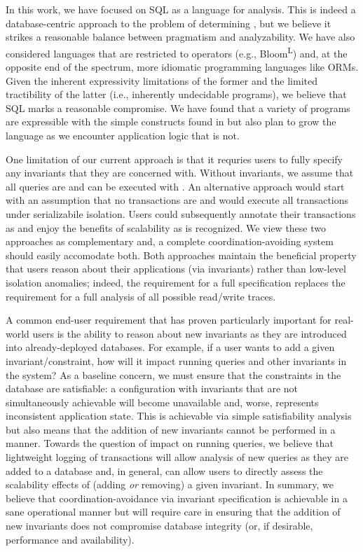  In this work, we have
focused on SQL as a language for analysis. This is indeed a
database-centric approach to the problem of determining \iconfluence,
but we believe it strikes a reasonable balance between pragmatism and
analyzability. We have also considered languages that are restricted
to \iconfluent operators (e.g., Bloom\textsuperscript{L}) and, at the opposite end of
the spectrum, more idiomatic programming languages like ORMs. Given
the inherent expressivity limitations of the former and the limited
tractibility of the latter (i.e., inherently undecidable programs), we
believe that SQL marks a reasonable compromise. We have found that a
variety of programs are expressible with the simple constructs found
in \lang but also plan to grow the language as we encounter
application logic that is not.

 One limitation of our current
approach is that it requries users to fully specify any invariants
that they are concerned with. Without invariants, we assume that all
queries are \iconfluent and can be executed with \cfreedom. An
alternative approach would start with an assumption that no
transactions are \iconfluent and would execute all transactions under
serializabile isolation. Users could subsequently annotate their
transactions as \iconfluent and enjoy the benefits of scalability as
\cfreedom is recognized. We view these two approaches as complementary
and, a complete coordination-avoiding system should easily accomodate
both. Both approaches maintain the beneficial property that users
reason about their applications (via invariants) rather than low-level
isolation anomalies; indeed, the requirement for a full specification
replaces the requirement for a full analysis of all possible
read/write traces.

 A common end-user requirement that has
proven particularly important for real-world users is the ability to
reason about new invariants as they are introduced into
already-deployed databases. For example, if a user wants to add a
given invariant/constraint, how will it impact running queries and
other invariants in the system? As a baseline concern, we must ensure
that the constraints in the database are satisfiable: a configuration
with invariants that are not simultaneously achievable will become
unavailable and, worse, represents inconsistent application
state. This is achievable via simple satisfiability analysis but also
means that the addition of new invariants cannot be performed in a
\cfree manner. Towards the question of impact on running queries, we
believe that lightweight logging of transactions will allow analysis
of new queries as they are added to a database and, in general, can
allow users to directly assess the scalability effects of (adding
\textit{or} removing) a given invariant. In summary, we believe that
coordination-avoidance via invariant specification is achievable in a
sane operational manner but will require care in ensuring that the
addition of new invariants does not compromise database integrity (or,
if desirable, performance and availability).
